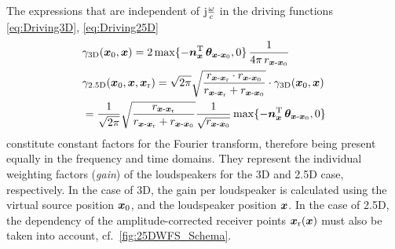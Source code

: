 The expressions that are independent of $\im\frac{\omega}{c}$
in the driving functions \eqref{eq:Driving3D}, \eqref{eq:Driving25D}
%
\begin{align}
&\gain_\text{3D}(\xp,\xs) = 2 \, \mathrm{max}\{-\nxT \, \bm{\theta}_{\xs\text{-}\xp}, 0\} \, \frac{1}{4\pi \, r_{\xs\text{-}\xp}}\\
%
&\gain_\text{2.5D}(\xp,\xs,\xr) =
\sqrt{2\pi}
\sqrt{\frac{r_{\xs\text{-}\xr} \cdot r_{\xs\text{-}\xp}}{r_{\xs\text{-}\xr} + r_{\xs\text{-}\xp}}}
\cdot \gain_\text{3D}(\xp,\xs)\nonumber\\
&={\frac{1}{\sqrt{2\pi}}}
\sqrt{\frac{r_{\xs\text{-}\xr}}{r_{\xs\text{-}\xr} + r_{\xs\text{-}\xp}}} \frac{1}{\sqrt{r_{\xs\text{-}\xp}}}
\,\mathrm{max}\{-\nxT \, \bm{\theta}_{\xs\text{-}\xp}, 0\}
\end{align}
%
constitute constant factors for the Fourier transform, therefore being present
equally in the frequency and time domains.
%
They represent the individual weighting factors (\textit{gain}) of the
loudspeakers for the 3D and 2.5D case, respectively.
%
In the case of 3D, the gain per loudspeaker is calculated using the virtual
source position $\bm{x}_\mathrm{0}$, and the loudspeaker position $\bm{x}$.
%
In the case of 2.5D, the dependency of the amplitude-corrected receiver points
$\bm{x}_\mathrm{r}(\bm{x})$ must also be taken into account, cf.~\myfig\ref{fig:25DWFS_Schema}.



